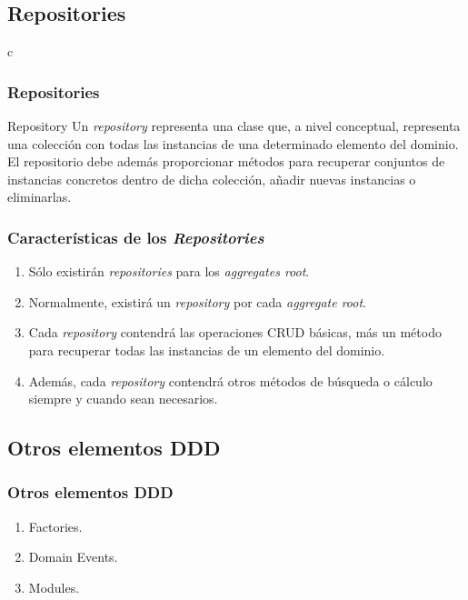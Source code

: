 \documentclass[handout,a4paper,slidestop,xcolor=pst,blue]{beamer}
\begin{document}
\subsection{Repositories}

\begin{frame}{c}
    \frametitle{Repositories}
    \begin{block}{Repository}
        Un \emph{repository} representa una clase que, a nivel conceptual, representa una colección con todas las instancias de una determinado elemento del dominio. El repositorio debe además proporcionar métodos para recuperar conjuntos de instancias concretos dentro de dicha colección, añadir nuevas instancias o eliminarlas.
    \end{block}
\end{frame}

\begin{frame}[c]
    \frametitle{Características de los \emph{Repositories}}
    \begin{enumerate}[<+->]
        \item Sólo existirán \emph{repositories} para los \emph{aggregates root}.
        \item Normalmente, existirá un \emph{repository} por cada \emph{aggregate root}.
        \item Cada \emph{repository} contendrá las operaciones CRUD básicas, más un método para recuperar todas las instancias de un elemento del dominio.
        \item Además, cada \emph{repository} contendrá otros métodos de búsqueda o cálculo siempre y cuando sean necesarios.
    \end{enumerate}
\end{frame}

\subsection{Otros elementos DDD}

\begin{frame}[c]
    \frametitle{Otros elementos DDD}
    \begin{enumerate}[<+->]
        \item Factories.
        \item Domain Events.
        \item Modules.
    \end{enumerate}
\end{frame}
\end{document}

